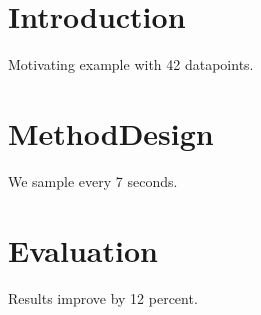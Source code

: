 \section{Introduction}
Motivating example with 42 datapoints.
\section{MethodDesign}
We sample every 7 seconds.
\section{Evaluation}
Results improve by 12 percent.
